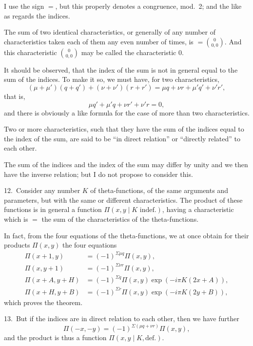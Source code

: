 \documentclass[11pt,a4paper]{book}
\begin{document}
I use the sign $=$, but this properly denotes a congruence, mod.~2; and the like as regards the indices.

The sum of two identical characteristics, or generally of any number of characteristics taken each of them any even number of times, is $= \binom{0}{0, 0}$. And this characteristic $\binom{0}{0, 0}$ may be called the characteristic $0$.

It should be observed, that the index of the sum is not in general equal to the sum of the indices. To make it so, we must have, for two characteristics,
\[
(\mu + \mu')(q + q') + (\nu + \nu')(r + r') = \mu q + \nu r + \mu' q' + \nu' r',
\]
that is,
\[
\mu q' + \mu' q + \nu r' + \nu' r = 0,
\]
and there is obviously a like formula for the case of more than two characteristics.

Two or more characteristics, such that they have the sum of the indices equal to the index of the sum, are said to be ``in direct relation'' or ``directly related'' to each other.

The sum of the indices and the index of the sum may differ by unity and we then have the inverse relation; but I do not propose to consider this.

\medskip

12.\ Consider any number $K$ of theta-functions, of the same arguments and parameters, but with the same or different characteristics. The product of these functions is in general a function $\Pi(x, y \mid K \text{ indef.})$, having a characteristic which is $=$ the sum of the characteristics of the theta-functions.

In fact, from the four equations of the theta-functions, we at once obtain for their products $\Pi(x, y)$ the four equations
\begin{align*}
\Pi(x+1, y) &= (-1)^{\Sigma\mu q}\Pi(x, y),\\
\Pi(x, y+1) &= (-1)^{\Sigma\nu r}\Pi(x, y),\\
\Pi(x+A, y+H) &= (-1)^{\Sigma q}\Pi(x, y)\exp(-i\pi K(2x + A)),\\
\Pi(x+H, y+B) &= (-1)^{\Sigma r}\Pi(x, y)\exp(-i\pi K(2y + B)),
\end{align*}
which proves the theorem.

\medskip

13.\ But if the indices are in direct relation to each other, then we have further
\[
\Pi(-x, -y) = (-1)^{\Sigma(\mu q + \nu r)}\Pi(x, y),
\]
and the product is thus a function $\Pi(x, y \mid K, \text{def.})$.
\end{document}

